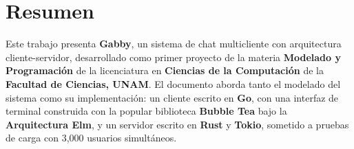 \section{Resumen}

Este trabajo presenta \textbf{Gabby}, un sistema de chat multicliente con arquitectura
cliente-servidor, desarrollado como primer proyecto de la materia \textbf{Modelado y
Programación} de la licenciatura en \textbf{Ciencias de la Computación} de la
\textbf{Facultad de Ciencias, UNAM}. El documento aborda tanto el modelado del sistema como
su implementación: un cliente escrito en \textbf{Go}, con una interfaz de terminal construida
con la popular biblioteca \textbf{Bubble Tea} bajo la \textbf{Arquitectura Elm}, y un servidor escrito
en \textbf{Rust} y \textbf{Tokio}, sometido a pruebas de carga con 3,000 usuarios simultáneos.
